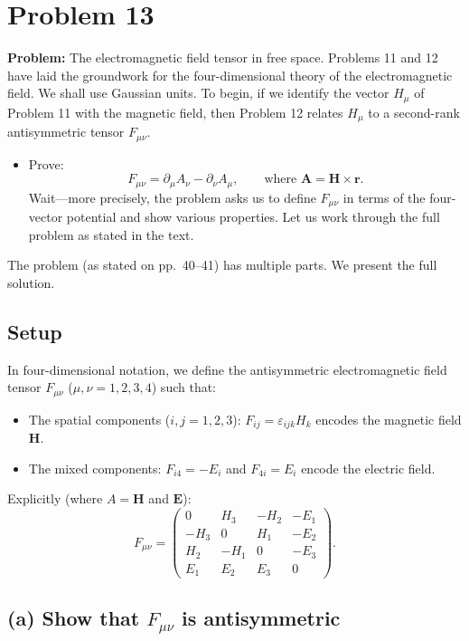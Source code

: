 \documentclass[12pt]{article}
\newcommand{\vect}[1]{\mathbf{#1}}
\begin{document}
\section*{Problem 13}

\textbf{Problem:} The electromagnetic field tensor in free space. Problems 11 and 12 have laid the groundwork for the four-dimensional theory of the electromagnetic field. We shall use Gaussian units. To begin, if we identify the vector $H_\mu$ of Problem 11 with the magnetic field, then Problem 12 relates $H_\mu$ to a second-rank antisymmetric tensor $F_{\mu\nu}$.

\begin{itemize}
\item[(a)] Prove:
\[
F_{\mu\nu} = \partial_\mu A_\nu - \partial_\nu A_\mu, \qquad \text{where } \vect{A} = \vect{H} \times \vect{r}.
\]
Wait---more precisely, the problem asks us to define $F_{\mu\nu}$ in terms of the four-vector potential and show various properties. Let us work through the full problem as stated in the text.
\end{itemize}

\bigskip

The problem (as stated on pp.~40--41) has multiple parts. We present the full solution.

\subsection*{Setup}

In four-dimensional notation, we define the antisymmetric electromagnetic field tensor $F_{\mu\nu}$ ($\mu,\nu = 1,2,3,4$) such that:
\begin{itemize}
\item The spatial components ($i,j = 1,2,3$): $F_{ij} = \varepsilon_{ijk}H_k$ encodes the magnetic field $\vect{H}$.
\item The mixed components: $F_{i4} = -E_i$ and $F_{4i} = E_i$ encode the electric field.
\end{itemize}

Explicitly (where $A = \vect{H}$ and $\vect{E}$):
\[
F_{\mu\nu} = \begin{pmatrix}
0 & H_3 & -H_2 & -E_1 \\
-H_3 & 0 & H_1 & -E_2 \\
H_2 & -H_1 & 0 & -E_3 \\
E_1 & E_2 & E_3 & 0
\end{pmatrix}.
\]

\subsection*{(a) Show that $F_{\mu\nu}$ is antisymmetric}
\end{document}
